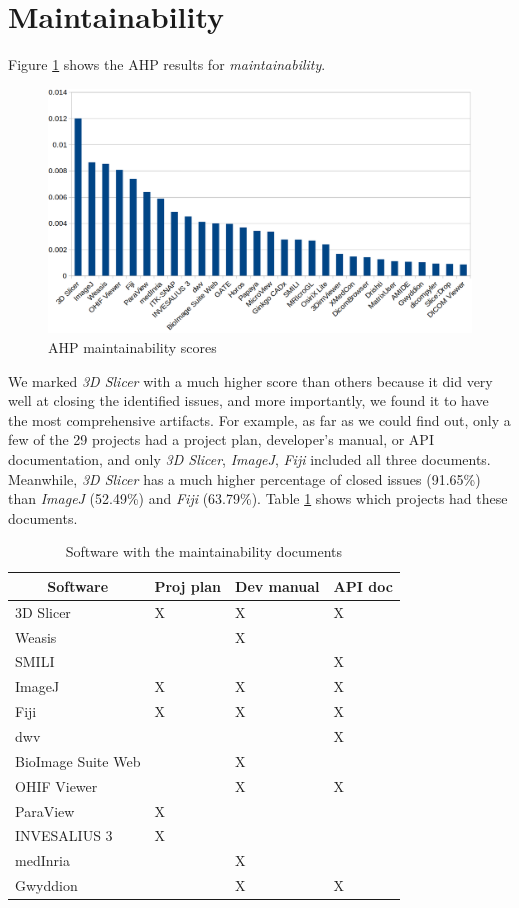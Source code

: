\section{Maintainability}
Figure \ref{fg_maintainability_scores} shows the AHP results for \textit{maintainability}. 

\begin{figure}[H]
\includegraphics[scale=0.38]{figures/maintainability_scores.png}
\caption{AHP maintainability scores}
\label{fg_maintainability_scores}
\end{figure}

We marked \textit{3D Slicer} with a much higher score than others because it did very well at closing the identified issues, and more importantly, we found it to have the most comprehensive artifacts. For example, as far as we could find out, only a few of the 29 projects had a project plan, developer's manual, or API documentation, and only \textit{3D Slicer}, \textit{ImageJ}, \textit{Fiji} included all three documents. Meanwhile, \textit{3D Slicer} has a much higher percentage of closed issues (91.65\%) than \textit{ImageJ} (52.49\%) and \textit{Fiji} (63.79\%). Table \ref{tab_maintainability_docs} shows which projects had these documents.

\begin{table}[H]
\centering
\begin{tabular}{llll}
\hline
\multicolumn{1}{c}{Software} & Proj plan & Dev manual & API doc \\ \hline
3D Slicer & X & X & X \\
Weasis &  & X &  \\
SMILI &  &  & X \\
ImageJ & X & X & X \\
Fiji & X & X & X \\
dwv &  &  & X \\
BioImage Suite Web &  & X &  \\
OHIF Viewer &  & X & X \\
ParaView & X &  &  \\
INVESALIUS 3 & X &  &  \\
medInria &  & X &  \\
Gwyddion &  & X & X \\ \hline
\end{tabular}
\caption{\label{tab_maintainability_docs}Software with the maintainability documents}
\end{table}

